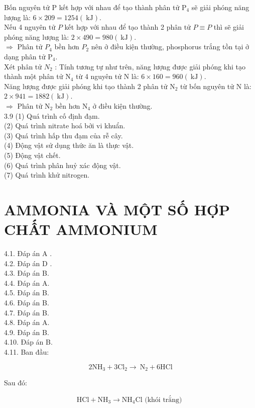 \documentclass[10pt]{article}
\begin{document}
Bốn nguyên tử P kết hợp với nhau để tạo thành phân tử $\mathrm{P}_{4}$ sẽ giải phóng năng lượng là: $6 \times 209=1254(\mathrm{~kJ})$.\\
Nếu 4 nguyên tử $P$ kết hợp với nhau để tạo thành 2 phân tử $P \equiv P$ thì sẽ giải phóng năng lượng là: $2 \times 490=980(\mathrm{~kJ})$.\\
$\Rightarrow$ Phân tử $P_{4}$ bền hơn $P_{2}$ nên ở điều kiện thường, phosphorus trắng tồn tại ở dạng phân tử $\mathrm{P}_{4}$.\\
Xét phân tử $N_{2}$ : Tính tương tự như trên, năng lượng được giải phóng khi tạo thành một phân tử $\mathrm{N}_{4}$ từ 4 nguyên tử N là: $6 \times 160=960(\mathrm{~kJ})$.\\
Năng lượng được giải phóng khi tạo thành 2 phân tử $\mathrm{N}_{2}$ từ bốn nguyên tử N là: $2 \times 941=1882(\mathrm{~kJ})$.\\
$\Rightarrow$ Phân tử $\mathrm{N}_{2}$ bền hơn $\mathrm{N}_{4}$ ở điều kiện thường.\\
3.9 (1) Quá trình cố định đạm.\\
(2) Quá trình nitrate hoá bởi vi khuẩn.\\
(3) Quá trình hấp thu đạm của rễ cây.\\
(4) Động vật sử dụng thức ăn là thực vật.\\
(5) Động vật chết.\\
(6) Quá trình phân huỷ xác động vật.\\
(7) Quá trình khử nitrogen.

\section*{AMMONIA VÀ MỘT SỐ HỢP CHẤT AMMONIUM}
4.1. Đáp án A .\\
4.2. Đáp án D .\\
4.3. Đáp án B.\\
4.4. Đáp án A.\\
4.5. Đáp án B.\\
4.6. Đáp án B.\\
4.7. Đáp án B.\\
4.8. Đáp án A.\\
4.9. Đáp án B.\\
4.10. Đáp án B.\\
4.11. Ban đầu:

$$
2 \mathrm{NH}_{3}+3 \mathrm{Cl}_{2} \rightarrow \mathrm{~N}_{2}+6 \mathrm{HCl}
$$

Sau đó:

$$
\mathrm{HCl}+\mathrm{NH}_{3} \rightarrow \mathrm{NH}_{4} \mathrm{Cl} \text { (khói trắng) }
$$
\end{document}
